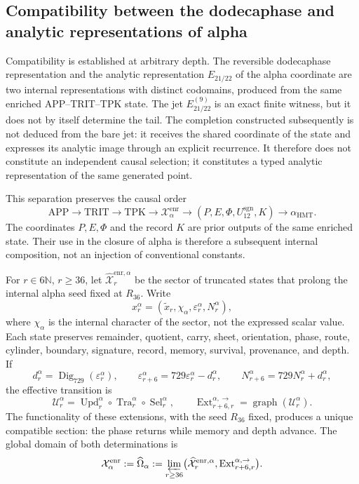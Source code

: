 \subsection{Compatibility between the dodecaphase and analytic representations of alpha}
\label{subsec:alpha-limite-dos-vias}

Compatibility is established at arbitrary depth. The reversible
dodecaphase representation and the analytic representation
\(E_{21/22}\) of the alpha coordinate are two internal representations with
distinct codomains, produced from the same enriched APP--TRIT--TPK state. The
jet \(E_{21/22}^{(9)}\) is an exact finite witness, but it does not by itself
determine the tail. The completion constructed subsequently is not deduced
from the bare jet: it receives the shared coordinate of the state and
expresses its analytic image through an explicit recurrence. It therefore
does not constitute an independent causal selection; it constitutes a typed
analytic representation of the same generated point.

This separation preserves the causal order
\[
 \mathrm{APP}\longrightarrow\mathrm{TRIT}\longrightarrow\mathrm{TPK}
 \longrightarrow\mathcal X_{\alpha}^{\mathrm{enr}}
 \longrightarrow (P,E,\Phi,U_{12}^{\mathrm{sgn}},K)
 \longrightarrow\alpha_{\mathrm{HMT}}.
\]
The coordinates \(P,E,\Phi\) and the record \(K\) are prior outputs of the
same enriched state. Their use in the closure of alpha is therefore a
subsequent internal composition, not an injection of conventional constants.

For \(r\in6\mathbb N\), \(r\ge36\), let
\(\widehat{\mathcal X}^{\mathrm{enr},\alpha}_r\) be the sector of truncated
states that prolong the internal alpha seed fixed at \(R_{36}\). Write
\[
 x_r^\alpha=(\widetilde x_r,\chi_\alpha,
              \varepsilon_r^\alpha,N_r^\alpha),
\]
where \(\chi_\alpha\) is the internal character of the sector, not the
expressed scalar value. Each state preserves remainder, quotient, carry,
sheet, orientation, phase, route, cylinder, boundary, signature, record,
memory, survival, provenance, and depth. If
\[
 d_r^\alpha=\operatorname{Dig}_{729}(\varepsilon_r^\alpha),\qquad
 \varepsilon_{r+6}^\alpha=729\varepsilon_r^\alpha-d_r^\alpha,
 \qquad N_{r+6}^\alpha=729N_r^\alpha+d_r^\alpha,
\]
the effective transition is
\[
 \mathcal U_r^\alpha=
 \operatorname{Upd}_r^\alpha\circ
 \operatorname{Tra}_r^\alpha\circ
 \operatorname{Sel}_r^\alpha,
 \qquad
 \operatorname{Ext}^{\alpha,\to}_{r+6,r}
 =\operatorname{graph}(\mathcal U_r^\alpha).
\]
The functionality of these extensions, with the seed \(R_{36}\) fixed,
produces a unique compatible section: the phase returns while memory and
depth advance. The global domain of both determinations is
\begin{equation}
 \mathcal X_\alpha^{\mathrm{enr}}:=\widehat\Omega_\alpha
 :=\varprojlim_{r\ge36}
 \bigl(\widehat{\mathcal X}^{\mathrm{enr},\alpha}_r,
       \operatorname{Ext}^{\alpha,\to}_{r+6,r}\bigr).
 \label{eq:alpha-dominio-enriquecido-completo}
\end{equation}


